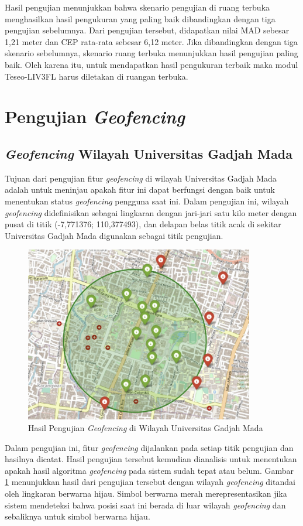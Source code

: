 Hasil pengujian menunjukkan bahwa skenario pengujian di ruang terbuka menghasilkan hasil pengukuran yang paling baik dibandingkan dengan tiga pengujian sebelumnya. Dari pengujian tersebut, didapatkan nilai MAD sebesar 1,21 meter dan CEP rata-rata sebesar 6,12 meter. Jika dibandingkan dengan tiga skenario sebelumnya, skenario ruang terbuka menunjukkan hasil pengujian paling baik. Oleh karena itu, untuk mendapatkan hasil pengukuran terbaik maka modul Teseo-LIV3FL harus diletakan di ruangan terbuka.

\section{Pengujian \textit{Geofencing}}
\subsection{\textit{Geofencing} Wilayah Universitas Gadjah Mada}
Tujuan dari pengujian fitur \textit{geofencing} di wilayah Universitas Gadjah Mada adalah untuk meninjau apakah fitur ini dapat berfungsi dengan baik untuk menentukan status \textit{geofencing} pengguna saat ini. Dalam pengujian ini, wilayah \textit{geofencing} didefinisikan sebagai lingkaran dengan jari-jari satu kilo meter dengan pusat di titik (-7,771376; 110,377493), dan delapan belas titik acak di sekitar Universitas Gadjah Mada digunakan sebagai titik pengujian.

\begin{figure}[H]
	\centering
	\includegraphics[width=10cm]{contents/chapter-4/geofencing/wilayah-ugm.jpg}
	\caption{Hasil Pengujian \textit{Geofencing} di Wilayah Universitas Gadjah Mada}
	\label{Fig: geofencing-1}
\end{figure}

Dalam pengujian ini, fitur \textit{geofencing} dijalankan pada setiap titik pengujian dan hasilnya dicatat. Hasil pengujian tersebut kemudian dianalisis untuk menentukan apakah hasil algoritma \textit{geofencing} pada sistem sudah tepat atau belum. Gambar \ref{Fig: geofencing-1} menunjukkan hasil dari pengujian tersebut dengan wilayah \textit{geofencing} ditandai oleh lingkaran berwarna hijau. Simbol berwarna merah merepresentasikan jika sistem mendeteksi bahwa posisi saat ini berada di luar wilayah \textit{geofencing} dan sebaliknya untuk simbol berwarna hijau.

